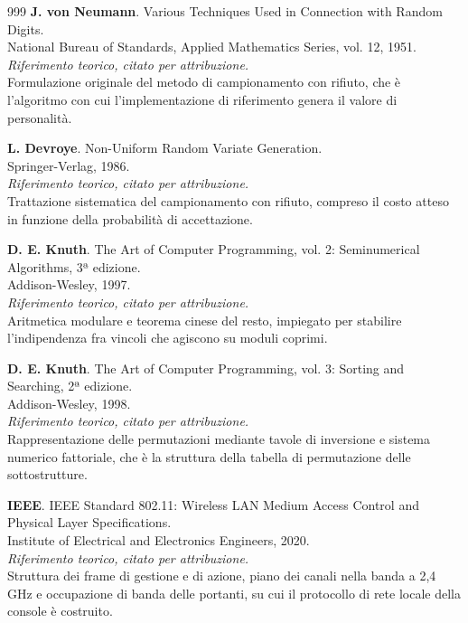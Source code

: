 \begin{thebibliography}{999}
  \textbf{J. von Neumann}. Various Techniques Used in Connection with Random Digits.
  \\ National Bureau of Standards, Applied Mathematics Series, vol. 12, 1951.
  \\ \emph{Riferimento teorico, citato per attribuzione.}
  \\ Formulazione originale del metodo di campionamento con rifiuto, che è l'algoritmo con cui l'implementazione di riferimento genera il valore di personalità.

  \textbf{L. Devroye}. Non-Uniform Random Variate Generation.
  \\ Springer-Verlag, 1986.
  \\ \emph{Riferimento teorico, citato per attribuzione.}
  \\ Trattazione sistematica del campionamento con rifiuto, compreso il costo atteso in funzione della probabilità di accettazione.

  \textbf{D. E. Knuth}. The Art of Computer Programming, vol. 2: Seminumerical Algorithms, 3ª edizione.
  \\ Addison-Wesley, 1997.
  \\ \emph{Riferimento teorico, citato per attribuzione.}
  \\ Aritmetica modulare e teorema cinese del resto, impiegato per stabilire l'indipendenza fra vincoli che agiscono su moduli coprimi.

  \textbf{D. E. Knuth}. The Art of Computer Programming, vol. 3: Sorting and Searching, 2ª edizione.
  \\ Addison-Wesley, 1998.
  \\ \emph{Riferimento teorico, citato per attribuzione.}
  \\ Rappresentazione delle permutazioni mediante tavole di inversione e sistema numerico fattoriale, che è la struttura della tabella di permutazione delle sottostrutture.

  \textbf{IEEE}. IEEE Standard 802.11: Wireless LAN Medium Access Control and Physical Layer Specifications.
  \\ Institute of Electrical and Electronics Engineers, 2020.
  \\ \emph{Riferimento teorico, citato per attribuzione.}
  \\ Struttura dei frame di gestione e di azione, piano dei canali nella banda a 2,4 GHz e occupazione di banda delle portanti, su cui il protocollo di rete locale della console è costruito.

\end{thebibliography}
